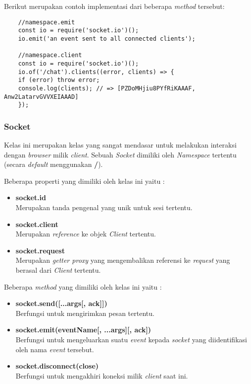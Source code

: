 Berikut merupakan contoh implementasi dari beberapa \textit{method} tersebut:

\begin{lstlisting}
	//namespace.emit
	const io = require('socket.io')();
	io.emit('an event sent to all connected clients');
	
	//namespace.client
	const io = require('socket.io')();
	io.of('/chat').clients((error, clients) => {
	if (error) throw error;
	console.log(clients); // => [PZDoMHjiu8PYfRiKAAAF, Anw2LatarvGVVXEIAAAD]
	});
\end{lstlisting}

\subsubsection{Socket}
Kelas ini merupakan kelas yang sangat mendasar untuk melakukan interaksi dengan \textit{browser} milik \textit{client}. Sebuah \textit{Socket} dimiliki oleh \textit{Namespace} tertentu (secara \textit{default} menggunakan \textbf{/}).

Beberapa properti yang dimiliki oleh kelas ini yaitu : 
\begin{itemize}
	\item \textbf{socket.id} \\ Merupakan tanda pengenal yang unik untuk sesi tertentu.
	\item \textbf{socket.client} \\ Merupakan \textit{reference} ke objek \textit{Client} tertentu.
	\item \textbf{socket.request} \\ Merupakan \textit{getter proxy} yang mengembalikan referensi ke \textit{request} yang berasal dari \textit{Client} tertentu.
\end{itemize}

Beberapa \textit{method} yang dimiliki oleh kelas ini yaitu : 
\begin{itemize}
	\item \textbf{socket.send([...args[, ack]])} \\ Berfungsi untuk mengirimkan pesan tertentu.
	\item \textbf{socket.emit(eventName[, ...args][, ack])} \\ Berfungsi untuk mengeluarkan suatu \textit{event} kepada \textit{socket} yang diidentifikasi oleh nama \textit{event} tersebut.
	\item \textbf{socket.disconnect(close)} \\ Berfungsi untuk mengakhiri koneksi milik \textit{client} saat ini.
\end{itemize}

